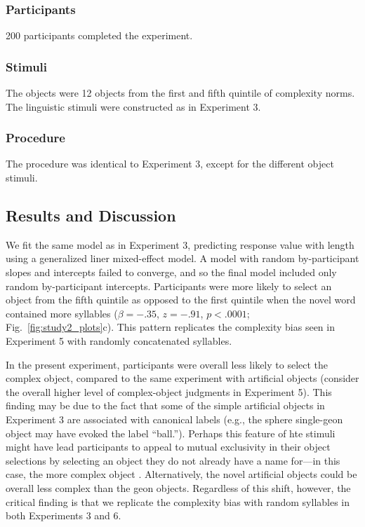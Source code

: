 \subsubsection{Participants} 200 participants completed the experiment.
\subsubsection{Stimuli} The objects were 12 objects from the first and fifth quintile of complexity norms. The linguistic stimuli were constructed as in Experiment 3.

\subsubsection{Procedure}
The procedure was identical to Experiment 3, except for the different object stimuli.

\subsection{Results and Discussion}
We fit the same model as in Experiment 3, predicting response value with length using a generalized liner mixed-effect model. A model with random by-participant slopes and intercepts failed to converge, and so the final model included only random by-participant intercepts. Participants were more likely to select an object from the fifth quintile as opposed to the first quintile when the novel word contained more syllables ($\beta = -.35$, $z = -.91$, $p < .0001$; Fig.\ \ref{fig:study2_plots}c). This pattern replicates the complexity bias seen in Experiment 5 with randomly concatenated syllables.

In the present experiment, participants were overall less likely to select the complex object, compared to the same experiment with artificial objects (consider the overall higher level of complex-object judgments in Experiment 5). This finding may be due to the fact that some of the simple artificial objects in Experiment 3 are associated with canonical labels (e.g., the sphere single-geon object may have evoked the label ``ball.''). Perhaps this feature of hte stimuli might have lead participants to appeal to mutual exclusivity in their object selections by selecting an object they do not already have a name for---in this case, the more complex object \cite{markman1988}. Alternatively, the novel artificial objects could be overall less complex than the geon objects. Regardless of this shift, however, the critical finding is that we replicate the complexity bias with random syllables in both Experiments 3 and 6.

